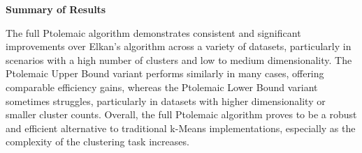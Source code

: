 \textbf{Summary of Results}

The full Ptolemaic algorithm demonstrates consistent and significant improvements over Elkan’s algorithm across a variety of datasets, particularly in scenarios with a high number of clusters and low to medium dimensionality. The Ptolemaic Upper Bound variant performs similarly in many cases, offering comparable efficiency gains, whereas the Ptolemaic Lower Bound variant sometimes struggles, particularly in datasets with higher dimensionality or smaller cluster counts. Overall, the full Ptolemaic algorithm proves to be a robust and efficient alternative to traditional k-Means implementations, especially as the complexity of the clustering task increases.